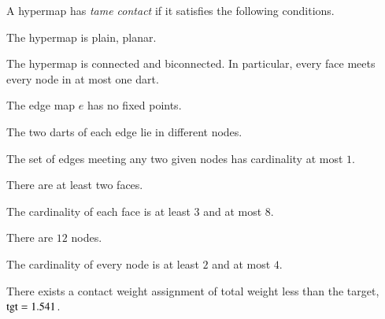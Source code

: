 A hypermap has {\it tame contact\/} if it satisfies the following
conditions.
%
%
%
%
%
%
%
%
%
\begin{nomerate}
    \item {} The hypermap is plain, planar.
    \item {} The hypermap is connected and biconnected.  In particular, every face meets every node in at most one dart.
    \item {} The edge map $e$ has no fixed points.
    \item {} The two darts of each edge lie in different nodes.
    \item {} The set of edges meeting any two given nodes has cardinality at most $1$.
    \item {}
  \item {} There are at least two faces.
    \item {} The cardinality of each face is at least $3$ and at most $8$.
    \item {} There are $12$ nodes.
    \item {} The cardinality of every node is at least $2$ and at most    $4$.
    \item {} There exists a contact weight assignment
        of total weight less than the target, ${\operatorname{tgt}}=1.541$.
\end{nomerate}
%

